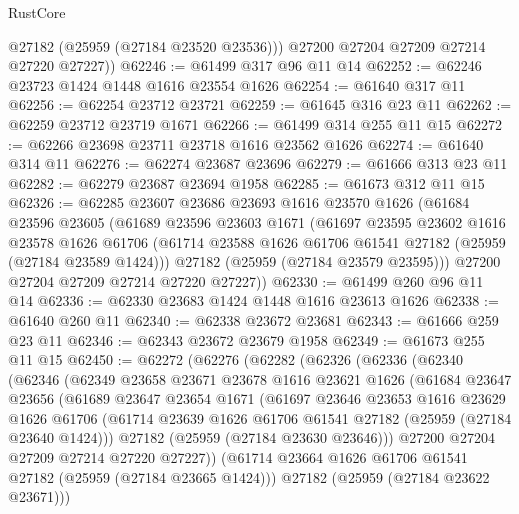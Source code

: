 \begin{lexlean}{RustCore}
\begin{coremodule}
          @27182
          (@25959 (@27184 @23520 @23536)))
        @27200
        @27204
        @27209
        @27214
        @27220
        @27227))
@62246 := @61499 @317 @96 @11 @14
@62252 := @62246 @23723 @1424 @1448 @1616 @23554 @1626
@62254 := @61640 @317 @11
@62256 := @62254 @23712 @23721
@62259 := @61645 @316 @23 @11
@62262 := @62259 @23712 @23719 @1671
@62266 := @61499 @314 @255 @11 @15
@62272 := @62266 @23698 @23711 @23718 @1616 @23562 @1626
@62274 := @61640 @314 @11
@62276 := @62274 @23687 @23696
@62279 := @61666 @313 @23 @11
@62282 := @62279 @23687 @23694 @1958
@62285 := @61673 @312 @11 @15
@62326 := @62285
    @23607
    @23686
    @23693
    @1616
    @23570
    @1626
    (@61684
      @23596
      @23605
      (@61689
        @23596
        @23603
        @1671
        (@61697
          @23595
          @23602
          @1616
          @23578
          @1626
          @61706
          (@61714 @23588 @1626 @61706 @61541 @27182 (@25959 (@27184 @23589 @1424)))
          @27182
          (@25959 (@27184 @23579 @23595)))
        @27200
        @27204
        @27209
        @27214
        @27220
        @27227))
@62330 := @61499 @260 @96 @11 @14
@62336 := @62330 @23683 @1424 @1448 @1616 @23613 @1626
@62338 := @61640 @260 @11
@62340 := @62338 @23672 @23681
@62343 := @61666 @259 @23 @11
@62346 := @62343 @23672 @23679 @1958
@62349 := @61673 @255 @11 @15
@62450 := @62272
    (@62276
      (@62282
        (@62326
          (@62336
            (@62340
              (@62346
                (@62349
                  @23658
                  @23671
                  @23678
                  @1616
                  @23621
                  @1626
                  (@61684
                    @23647
                    @23656
                    (@61689
                      @23647
                      @23654
                      @1671
                      (@61697
                        @23646
                        @23653
                        @1616
                        @23629
                        @1626
                        @61706
                        (@61714 @23639 @1626 @61706 @61541 @27182 (@25959 (@27184 @23640 @1424)))
                        @27182
                        (@25959 (@27184 @23630 @23646)))
                      @27200
                      @27204
                      @27209
                      @27214
                      @27220
                      @27227))
                  (@61714 @23664 @1626 @61706 @61541 @27182 (@25959 (@27184 @23665 @1424)))
                  @27182
                  (@25959 (@27184 @23622 @23671)))

\end{coremodule}
\end{lexlean}
